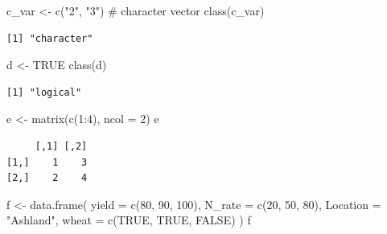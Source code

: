 \documentclass[
  letterpaper,
  DIV=11,
  numbers=noendperiod]{scrartcl}
\newenvironment{Shaded}{\begin{snugshade}}{\end{snugshade}}
\newcommand{\AttributeTok}[1]{\textcolor[rgb]{0.40,0.45,0.13}{#1}}
\newcommand{\CommentTok}[1]{\textcolor[rgb]{0.37,0.37,0.37}{#1}}
\newcommand{\ConstantTok}[1]{\textcolor[rgb]{0.56,0.35,0.01}{#1}}
\newcommand{\DecValTok}[1]{\textcolor[rgb]{0.68,0.00,0.00}{#1}}
\newcommand{\FunctionTok}[1]{\textcolor[rgb]{0.28,0.35,0.67}{#1}}
\newcommand{\NormalTok}[1]{\textcolor[rgb]{0.00,0.23,0.31}{#1}}
\newcommand{\OtherTok}[1]{\textcolor[rgb]{0.00,0.23,0.31}{#1}}
\newcommand{\SpecialCharTok}[1]{\textcolor[rgb]{0.37,0.37,0.37}{#1}}
\newcommand{\StringTok}[1]{\textcolor[rgb]{0.13,0.47,0.30}{#1}}
\begin{document}
\begin{Shaded}
\begin{Highlighting}[]
\NormalTok{c\_var }\OtherTok{\textless{}{-}} \FunctionTok{c}\NormalTok{(}\StringTok{"2"}\NormalTok{, }\StringTok{"3"}\NormalTok{)   }\CommentTok{\# character vector}
\FunctionTok{class}\NormalTok{(c\_var)}
\end{Highlighting}
\end{Shaded}

\begin{verbatim}
[1] "character"
\end{verbatim}

\begin{Shaded}
\begin{Highlighting}[]
\NormalTok{d }\OtherTok{\textless{}{-}} \ConstantTok{TRUE}
\FunctionTok{class}\NormalTok{(d)}
\end{Highlighting}
\end{Shaded}

\begin{verbatim}
[1] "logical"
\end{verbatim}

\begin{Shaded}
\begin{Highlighting}[]
\NormalTok{e }\OtherTok{\textless{}{-}} \FunctionTok{matrix}\NormalTok{(}\FunctionTok{c}\NormalTok{(}\DecValTok{1}\SpecialCharTok{:}\DecValTok{4}\NormalTok{), }\AttributeTok{ncol =} \DecValTok{2}\NormalTok{)}
\NormalTok{e}
\end{Highlighting}
\end{Shaded}

\begin{verbatim}
     [,1] [,2]
[1,]    1    3
[2,]    2    4
\end{verbatim}

\begin{Shaded}
\begin{Highlighting}[]
\NormalTok{f }\OtherTok{\textless{}{-}} \FunctionTok{data.frame}\NormalTok{(}
  \AttributeTok{yield    =} \FunctionTok{c}\NormalTok{(}\DecValTok{80}\NormalTok{, }\DecValTok{90}\NormalTok{, }\DecValTok{100}\NormalTok{),}
  \AttributeTok{N\_rate   =} \FunctionTok{c}\NormalTok{(}\DecValTok{20}\NormalTok{, }\DecValTok{50}\NormalTok{, }\DecValTok{80}\NormalTok{),}
  \AttributeTok{Location =} \StringTok{"Ashland"}\NormalTok{,}
  \AttributeTok{wheat    =} \FunctionTok{c}\NormalTok{(}\ConstantTok{TRUE}\NormalTok{, }\ConstantTok{TRUE}\NormalTok{, }\ConstantTok{FALSE}\NormalTok{)}
\NormalTok{)}
\NormalTok{f}
\end{Highlighting}
\end{Shaded}
\end{document}
